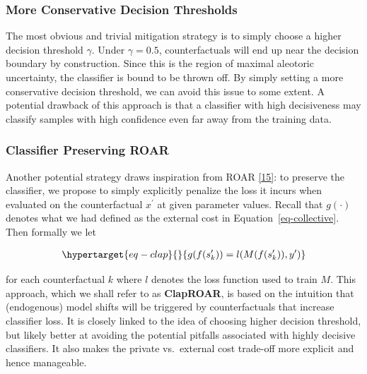 \documentclass[
  conference]{IEEEtran}
\begin{document}
\hypertarget{more-conservative-decision-thresholds}{%
\subsubsection{More Conservative Decision
Thresholds}\label{more-conservative-decision-thresholds}}

The most obvious and trivial mitigation strategy is to simply choose a
higher decision threshold \(\gamma\). Under \(\gamma=0.5\),
counterfactuals will end up near the decision boundary by construction.
Since this is the region of maximal aleotoric uncertainty, the
classifier is bound to be thrown off. By simply setting a more
conservative decision threshold, we can avoid this issue to some extent.
A potential drawback of this approach is that a classifier with high
decisiveness may classify samples with high confidence even far away
from the training data.

\hypertarget{classifier-preserving-roar}{%
\subsubsection{Classifier Preserving
ROAR}\label{classifier-preserving-roar}}

Another potential strategy draws inspiration from ROAR
\protect\hyperlink{ref-upadhyay2021towards}{{[}15{]}}: to preserve the
classifier, we propose to simply explicitly penalize the loss it incurs
when evaluated on the counterfactual \(x^\prime\) at given parameter
values. Recall that \(g(\cdot)\) denotes what we had defined as the
external cost in Equation~\ref{eq-collective}. Then formally we let

\begin{equation}\protect\hypertarget{eq-clap}{}{
\begin{aligned}
g(f(s_k^\prime)) = l(M(f(s_k^\prime)),y^\prime)
\end{aligned}
}\label{eq-clap}\end{equation}

for each counterfactual \(k\) where \(l\) denotes the loss function used
to train \(M\). This approach, which we shall refer to as
\textbf{ClapROAR}, is based on the intuition that (endogenous) model
shifts will be triggered by counterfactuals that increase classifier
loss. It is closely linked to the idea of choosing higher decision
threshold, but likely better at avoiding the potential pitfalls
associated with highly decisive classifiers. It also makes the private
vs.~external cost trade-off more explicit and hence manageable.
\end{document}
